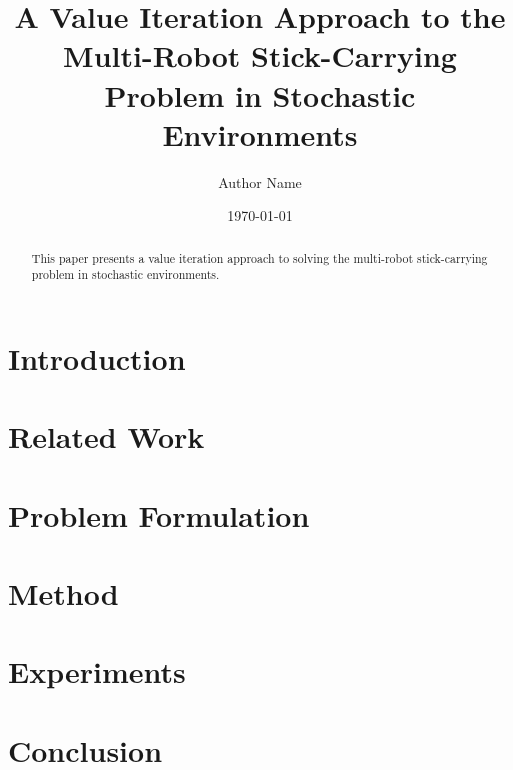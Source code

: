 \documentclass[12pt,a4paper]{article}
\title{A Value Iteration Approach to the Multi-Robot Stick-Carrying Problem in Stochastic Environments}
\author{Author Name}
\date{\today}
\begin{document}
\maketitle

\begin{abstract}
This paper presents a value iteration approach to solving the multi-robot stick-carrying problem in stochastic environments.
\end{abstract}

\section{Introduction}

\section{Related Work}

\section{Problem Formulation}

\section{Method}

\section{Experiments}

\section{Conclusion}



\end{document}
